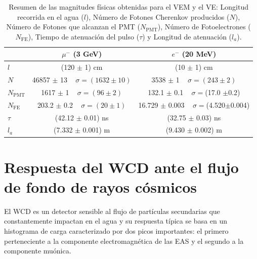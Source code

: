 \documentclass[12pt,oneside,openany,letter]{book}
\begin{document}
\begin{table}[h!]
\label{t:comparacion}
\centering
\caption{Resumen de las magnitudes físicas obtenidas para el VEM y el VE: Longitud recorrida en el agua ($l$), Número de Fotones Cherenkov producidos ($N$), Número de Fotones que alcanzan el PMT ($N_{\mathrm{PMT}}$), Número de Fotoelectrones ($N_{\mathrm{FE}}$), Tiempo de atenuación del pulso ($\tau$) y Longitud de atenuación ($l_a$).}
\begin{tabular}{l|c|c|}
\cline{2-3}
                                                     & \textbf{$\mu^-$ (3 GeV) }& \textbf{$e^-$ (20 MeV)} \\ \hline
\multicolumn{1}{|l|}{\textbf{$l$}}   &          (120 $\pm$ 1) cm      &    (10 $\pm$ 1) cm        \\ \hline
\multicolumn{1}{|l|}{\textbf{$N$}}    &         46857 $\pm$ 13 $\,\,\,\,\, \sigma = (1632 \pm 10)$   &      3538 $\pm$ 1 $\,\,\,\,\, \sigma = (243 \pm 2)$      \\ \hline
\multicolumn{1}{|l|}{$N_{\mathrm{PMT}}$}       &          1617 $\pm$ 1 $\,\,\,\,\, \sigma = (96 \pm 2)$     &     132.1 $\pm$ 0.1 $\,\,\,\,\, \sigma = $(17.0 $\pm $0.2)       \\ \hline
\multicolumn{1}{|l|}{$N_{\mathrm{FE}}$}       &          203.2 $\pm$ 0.2 $\,\,\,\,\, \sigma = (20 \pm 1)$     &     16.729 $\pm$ 0.003 $\,\,\,\,\, \sigma = $(4.520$ \pm $0.004)       \\ \hline
\multicolumn{1}{|l|}{$\tau$} &          (42.12 $\pm$ 0.01) ns      &      (32.75 $\pm$ 0.03) ns      \\ \hline
\multicolumn{1}{|l|}{$l_a$} &          (7.332 $\pm$ 0.001) m      &      (9.430 $\pm$ 0.002) m      \\ \hline
\end{tabular}
\end{table}

\section{Respuesta del WCD ante el flujo de fondo de rayos cósmicos}\label{WCDFLUJOR}
El WCD es un detector sensible al flujo de partículas secundarias que constantemente impactan en el agua y su respuesta típica se basa en un histograma de carga caracterizado por dos picos importantes: el primero perteneciente a la componente electromagnética de las EAS y el segundo a la componente muónica. 
\end{document}
